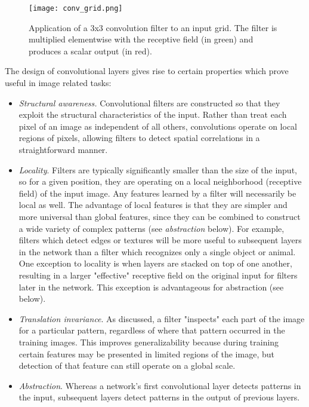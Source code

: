 \begin{figure}
	\centering
	\texttt{[image: conv\_grid.png]}
	\caption{Application of a 3x3 convolution filter to an input grid. The filter is multiplied elementwise with the receptive field (in green) and produces a scalar output (in red).}
	\label{fig:convolutionallayer}
\end{figure}

The design of convolutional layers gives rise to certain properties which prove useful in image related tasks:
 \begin{itemize}
 	\item \textit{Structural awareness.}
 	Convolutional filters are constructed so that they exploit the structural characteristics of the input.
 	Rather than treat each pixel of an image as independent of all others, convolutions operate on local regions of pixels, allowing filters to detect spatial correlations in a straightforward manner.
 	\item \textit{Locality}. 
 	Filters are typically significantly smaller than the size of the input, so for a given position, they are operating on a local neighborhood (receptive field) of the input image. 
 	Any features learned by a filter will necessarily be local as well. 
 	The advantage of local features is that they are simpler and more universal than global features, since they can be combined to construct a wide variety of complex patterns (see \textit{abstraction} below).
 	For example, filters which detect edges or textures will be more useful to subsequent layers in the network than a filter which recognizes only a single object or animal.
 	One exception to locality is when layers are stacked on top of one another, resulting in a larger "effective" receptive field on the original input for filters later in the network.
 	This exception is advantageous for abstraction (see below).
 	\item \textit{Translation invariance}. 
 	As discussed, a filter "inspects" each part of the image for a particular pattern, regardless of where that pattern occurred in the training images.
 	This improves generalizability because during training certain features may be presented in limited regions of the image, but detection of that feature can still operate on a global scale.
 	\item \textit{Abstraction}. Whereas a network's first convolutional layer detects patterns in the input, subsequent layers detect patterns in the output of previous layers. 

\end{itemize}

